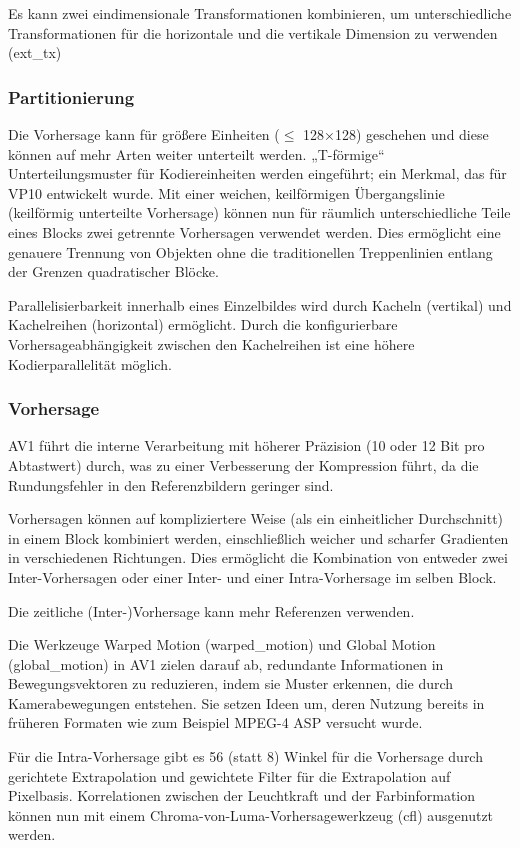 \documentclass[conference]{IEEEtran}
\begin{document}
Es kann zwei eindimensionale Transformationen kombinieren, um unterschiedliche Transformationen für die horizontale und die vertikale Dimension zu verwenden (ext\_tx)
\subsubsection{Partitionierung}
Die Vorhersage kann für größere Einheiten ($\leq$ 128×128) geschehen und diese können auf mehr Arten weiter unterteilt werden. „T-förmige“ Unterteilungsmuster für Kodiereinheiten werden eingeführt; ein Merkmal, das für VP10 entwickelt wurde. Mit einer weichen, keilförmigen Übergangslinie (keilförmig unterteilte Vorhersage) können nun für räumlich unterschiedliche Teile eines Blocks zwei getrennte Vorhersagen verwendet werden. Dies ermöglicht eine genauere Trennung von Objekten ohne die traditionellen Treppenlinien entlang der Grenzen quadratischer Blöcke.

Parallelisierbarkeit innerhalb eines Einzelbildes wird durch Kacheln (vertikal) und Kachelreihen (horizontal) ermöglicht.
Durch die konfigurierbare Vorhersageabhängigkeit zwischen den Kachelreihen ist eine höhere Kodierparallelität möglich.
\subsubsection{Vorhersage}
AV1 führt die interne Verarbeitung mit höherer Präzision (10 oder 12 Bit pro Abtastwert) durch, was zu einer Verbesserung der Kompression führt, da die Rundungsfehler in den Referenzbildern geringer sind.

Vorhersagen können auf kompliziertere Weise (als ein einheitlicher Durchschnitt) in einem Block kombiniert werden, einschließlich weicher und scharfer Gradienten in verschiedenen Richtungen. Dies ermöglicht die Kombination von entweder zwei Inter-Vorhersagen oder einer Inter- und einer Intra-Vorhersage im selben Block.

Die zeitliche (Inter-)Vorhersage kann mehr Referenzen verwenden.

Die Werkzeuge Warped Motion (warped\_motion) und Global Motion (global\_motion) in AV1 zielen darauf ab, redundante Informationen in Bewegungsvektoren zu reduzieren, indem sie Muster erkennen, die durch Kamerabewegungen entstehen. Sie setzen Ideen um, deren Nutzung bereits in früheren Formaten wie zum Beispiel MPEG-4 ASP versucht wurde.

Für die Intra-Vorhersage gibt es 56 (statt 8) Winkel für die Vorhersage durch gerichtete Extrapolation und gewichtete Filter für die Extrapolation auf Pixelbasis. Korrelationen zwischen der Leuchtkraft und der Farbinformation können nun mit einem Chroma-von-Luma-Vorhersagewerkzeug (cfl) ausgenutzt werden.

\end{document}
